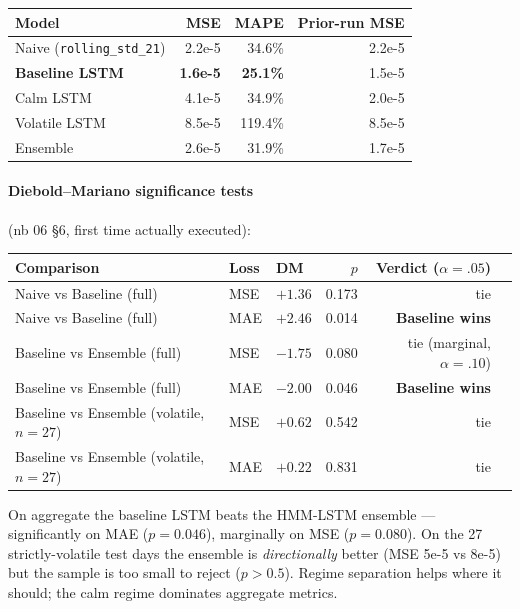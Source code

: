 \documentclass[11pt]{article}
\begin{document}
\begin{center}
\begin{tabular}{lrrr}
\toprule
Model & MSE & MAPE & Prior-run MSE \\
\midrule
Naive (\texttt{rolling\_std\_21}) & 2.2e-5 & 34.6\% & 2.2e-5 \\
\textbf{Baseline LSTM}            & \textbf{1.6e-5} & \textbf{25.1\%} & 1.5e-5 \\
Calm LSTM                         & 4.1e-5 & 34.9\% & 2.0e-5 \\
Volatile LSTM                     & 8.5e-5 & 119.4\% & 8.5e-5 \\
Ensemble                          & 2.6e-5 & 31.9\% & 1.7e-5 \\
\bottomrule
\end{tabular}
\end{center}

\paragraph{Diebold--Mariano significance tests} (nb 06 \S6, first time actually executed):

\begin{center}
\renewcommand{\arraystretch}{1.1}
\begin{tabular}{@{}lllrrl@{}}
\toprule
Comparison & Loss & DM & $p$ & Verdict ($\alpha=.05$) \\
\midrule
Naive vs Baseline (full)               & MSE & $+1.36$ & 0.173 & tie \\
Naive vs Baseline (full)               & MAE & $+2.46$ & 0.014 & \textbf{Baseline wins} \\
Baseline vs Ensemble (full)            & MSE & $-1.75$ & 0.080 & tie (marginal, $\alpha=.10$) \\
Baseline vs Ensemble (full)            & MAE & $-2.00$ & 0.046 & \textbf{Baseline wins} \\
Baseline vs Ensemble (volatile, $n=27$)& MSE & $+0.62$ & 0.542 & tie \\
Baseline vs Ensemble (volatile, $n=27$)& MAE & $+0.22$ & 0.831 & tie \\
\bottomrule
\end{tabular}
\end{center}

On aggregate the baseline LSTM beats the HMM-LSTM ensemble --- significantly on MAE ($p=0.046$), marginally on MSE ($p=0.080$). On the 27 strictly-volatile test days the ensemble is \emph{directionally} better (MSE 5e-5 vs 8e-5) but the sample is too small to reject ($p > 0.5$). Regime separation helps where it should; the calm regime dominates aggregate metrics.
\end{document}
